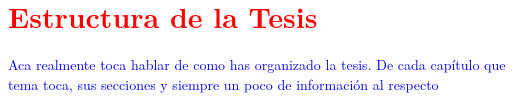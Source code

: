 \section*{\textcolor{red}{Estructura de la Tesis}}
\textcolor{blue}{Aca realmente toca hablar de como has organizado la tesis. De cada capítulo que tema toca, sus secciones y siempre un poco de información al respecto}
